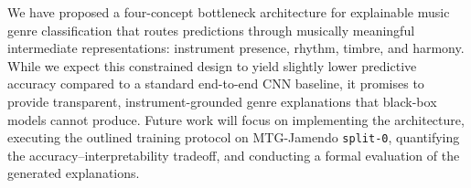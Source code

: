 \documentclass[sigconf,nonacm]{acmart}
\begin{document}
We have proposed a four-concept bottleneck architecture for explainable music genre
classification that routes predictions through musically meaningful intermediate representations:
instrument presence, rhythm, timbre, and harmony. While we expect this constrained design to
yield slightly lower predictive accuracy compared to a standard end-to-end CNN baseline, it
promises to provide transparent, instrument-grounded genre explanations that black-box models
cannot produce. Future work will focus on implementing the architecture, executing the outlined
training protocol on MTG-Jamendo \texttt{split-0}, quantifying the accuracy--interpretability
tradeoff, and conducting a formal evaluation of the generated explanations.



\end{document}
